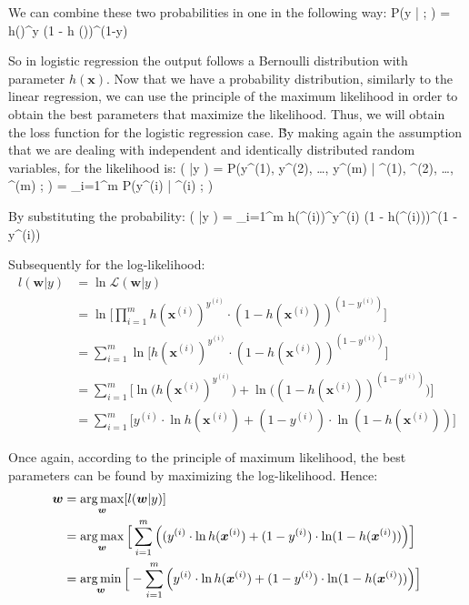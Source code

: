 We can combine these two probabilities in one in the following way:
\bse
P(y | ; ) = h()^y \cdot (1 - h ())^{(1-y)}
\ese

So in logistic regression the output follows a Bernoulli distribution with parameter $h(\boldsymbol{x})$. Now that we
have a probability distribution, similarly to the linear regression, we can use the principle of the maximum
likelihood in order to obtain the best parameters that maximize the likelihood. Thus, we will obtain the loss
function for the logistic regression case. \v

By making again the assumption that we are dealing with independent and identically distributed random variables, for
the likelihood is:
\bse
{} ( |y ) = P(y^{(1)}, y^{(2)}, \ldots, y^{(m)} | ^{(1)}, ^{(2)},
\ldots, ^{(m)} ; ) = \prod_{i=1}^{m} P(y^{(i)} | ^{(i)} ; )
\ese

By substituting the probability:
\bse
{} ( |y )
= \prod_{i=1}^{m} h(^{(i)})^{y^{(i)}} \cdot (1 - h(^{(i)}))^{(1 - {y^{(i)}})}
\ese

Subsequently for the log-likelihood:
{\setlength{\jot}{10pt}
\begin{align*}
l (\boldsymbol{w} |y ) &= \ln \mathcal{L} (\boldsymbol{w} |y ) \\
&= \ln \Big[ \prod_{i=1}^{m} h(\boldsymbol{x}^{(i)})^{y^{(i)}}
\cdot (1 - h(\boldsymbol{x}^{(i)}))^{(1 - {y^{(i)}})} \Big] \\
&= \sum_{i=1}^{m} \ln \Big[ h(\boldsymbol{x}^{(i)})^{y^{(i)}}
\cdot (1 - h(\boldsymbol{x}^{(i)}))^{(1 - {y^{(i)}})} \Big] \\
&= \sum_{i=1}^{m} \Big[ \ln \Big( h(\boldsymbol{x}^{(i)})^{y^{(i)}}\Big)
+ \ln \Big( (1 - h(\boldsymbol{x}^{(i)}))^{(1 - {y^{(i)}})} \Big) \Big] \\
&= \sum_{i=1}^{m} \Big[ y^{(i)} \cdot \ln h(\boldsymbol{x}^{(i)})
+ (1 - {y^{(i)}}) \cdot \ln (1 - h (\boldsymbol{x}^{(i)})) \Big]
\end{align*}}

Once again, according to the principle of maximum likelihood, the best parameters can be found by maximizing the
log-likelihood. Hence:
{\setlength{\jot}{10pt}
\begin{align*}
\boldsymbol{w} &= \operatorname*{arg\,max}_{\boldsymbol{w}} [l (\boldsymbol{w} |y )] \\
&= \operatorname*{arg\,max}_{\boldsymbol{w}} \Big[ \sum_{i=1}^{m} \Big( (y^{(i)}
\cdot \ln h(\boldsymbol{x}^{(i)}) + (1 - {y^{(i)}}) \cdot \ln (1 - h(\boldsymbol{x}^{(i)})) \Big) \Big] \\
&= \operatorname*{arg\,min}_{\boldsymbol{w}} \Big[ - \sum_{i=1}^{m} \Big( y^{(i)}
\cdot \ln h(\boldsymbol{x}^{(i)}) + (1 - {y^{(i)}}) \cdot \ln (1 - h(\boldsymbol{x}^{(i)})) \Big) \Big]
\end{align*}}

